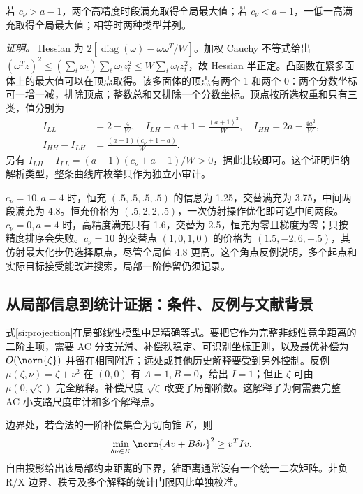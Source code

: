 \begin{proposition}[四时段说明模型的全局形状]
若 $c_\nu>a-1$，两个高精度时段满充取得全局最大值；若 $c_\nu<a-1$，一低一高满充取得全局最大值；相等时两种类型并列。
\end{proposition}
\noindent\emph{证明。} Hessian 为 $2[\operatorname{diag}(\omega)-\omega\omega^T/W]$。加权 Cauchy 不等式给出
$(\omega^Tz)^2\le(\sum_t\omega_t)\sum_t\omega_tz_t^2\le W\sum_t\omega_tz_t^2$，故 Hessian 半正定。凸函数在紧多面体上的最大值可以在顶点取得。该多面体的顶点有两个 1 和两个 0：两个分数坐标可一增一减，排除顶点；整数总和又排除一个分数坐标。顶点按所选权重和只有三类，值分别为
\begin{align}
 I_{LL}&=2-\frac4W,\quad I_{LH}=a+1-\frac{(a+1)^2}{W},\quad
 I_{HH}=2a-\frac{4a^2}{W},\nonumber\\
 I_{HH}-I_{LH}&=\frac{(a-1)(c_\nu+1-a)}W.
 \label{si:three-types}
\end{align}
另有 $I_{LH}-I_{LL}=(a-1)(c_\nu+a-1)/W>0$，据此比较即可。这个证明归纳解析类型，整条曲线库枚举只作为独立小审计。

$c_\nu=10,a=4$ 时，恒充 $(.5,.5,.5,.5)$ 的信息为 1.25，交替满充为 3.75，中间两段满充为 4.8。恒充价格为 $(.5,2,2,.5)$，一次仿射操作优化即可选中间两段。$c_\nu=0,a=4$ 时，高精度满充只有 1.6，交替为 2.5，恒充为零且梯度为零；只按精度排序会失败。$c_\nu=10$ 的交替点 $(1,0,1,0)$ 的价格为 $(1.5,-2,6,-.5)$，其仿射最大化步仍选择原点，尽管全局值 4.8 更高。这个角点反例说明，多个起点和实际目标接受能改进搜索，局部一阶停留仍须记录。

\subsection{从局部信息到统计证据：条件、反例与文献背景}

式\eqref{si:projection}在局部线性模型中是精确等式。要把它作为完整非线性竞争距离的二阶主项，需要 AC 分支光滑、补偿秩稳定、可识别坐标正则，以及最优补偿为 $O(\norm{\zeta})$ 并留在相同附近；远处或其他历史解释要受到另外控制。反例 $\mu(\zeta,\nu)=\zeta+\nu^2$ 在 $(0,0)$ 有 $A=1,B=0$，给出 $I=1$；但正 $\zeta$ 可由 $\mu(0,\sqrt\zeta)$ 完全解释。补偿尺度 $\sqrt\zeta$ 改变了局部阶数。这解释了为何需要完整 AC 小支路尺度审计和多个解释点。

边界处，若合法的一阶补偿集合为切向锥 $K$，则
\begin{equation}
 \min_{\delta\nu\in K}\norm{Av+B\delta\nu}^2\ge v^TIv.
 \label{si:cone}
\end{equation}
自由投影给出该局部约束距离的下界，锥距离通常没有一个统一二次矩阵。非负 R/X 边界、秩亏及多个解释的统计门限因此单独校准。

